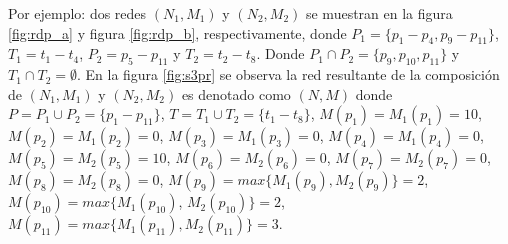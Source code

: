 Por ejemplo: dos redes $(N_1, M_1)$ y $(N_2, M_2)$ se muestran en la figura \ref{fig:rdp_a} y figura \ref{fig:rdp_b}, respectivamente, donde $P_1= \{p_1-p_4, p_9-p_11\}$, $T_1={t_1-t_4}$, $P_2={p_5-p_{11}}$ y $T_2={t_2-t_8}$. Donde $P_1 \cap P_2 = \{p_9,p_{10},p_{11}\}$ y $T_1 \cap T_2 = \emptyset$. En la figura \ref{fig:s3pr} se observa la red resultante de la composición de $(N_1, M_1)$ y $(N_2, M_2)$ es denotado como $(N,M)$ donde $P = P_1 \cup P_2 = \{p_1-p_{11}\}$, $T = T_1 \cup T_2 = \{t_1-t_8\}$, $M(p_1) = M_1(p_1) = 10$, $M(p_2) = M_1(p_2) = 0$, $M(p_3) = M_1(p_3) = 0$, $M(p_4) = M_1(p_4) = 0$, $M(p_5) = M_2(p_5) = 10$, $M(p_6) = M_2(p_6) = 0$, $M(p_7) = M_2(p_7) = 0$, $M(p_8) = M_2(p_8) = 0$, $M(p_9) = max\{M_1(p_9),M_2(p_9)\} = 2$, $M(p_{10}) = max\{M_1(p_{10})$, $M_2(p_{10})\} = 2$, $M(p_11) = max\{M_1(p_{11}), M_2(p_{11})\} = 3$.


